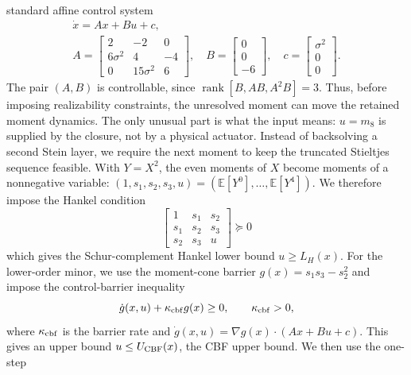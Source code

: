 \documentclass{article}
\theoremstyle{definition}
\begin{document}
standard affine control system
\begin{equation}\label{eq:dw-affine-control}
  \begin{gathered}
  \dot{x}=Ax+Bu+c,\\
  A=
  \begin{bmatrix}
    2 & -2 & 0\\
    6\sigma^2 & 4 & -4\\
    0 & 15\sigma^2 & 6
  \end{bmatrix},
  \quad
  B=
  \begin{bmatrix}
    0\\ 0\\ -6
  \end{bmatrix},
  \quad
  c=
  \begin{bmatrix}
    \sigma^2\\ 0\\ 0
  \end{bmatrix}.
  \end{gathered}
\end{equation}
The pair $(A,B)$ is controllable, since
$\operatorname{rank}[B,AB,A^2B]=3$. Thus, before imposing realizability
constraints, the unresolved moment can move the retained moment
dynamics. The only unusual part is what the input means: $u=m_8$ is
supplied by the closure, not by a physical actuator.
Instead of backsolving a second Stein layer, we require the next moment
to keep the truncated Stieltjes sequence feasible. With $Y=X^2$,
the even moments of $X$ become moments of a nonnegative variable:
$(1,s_1,s_2,s_3,u)=(\mathbb{E}[Y^0],\ldots,\mathbb{E}[Y^4])$.
We therefore impose the Hankel condition
\begin{equation}\label{eq:dw-hankel-condition}
  \begin{bmatrix}
    1 & s_1 & s_2\\
    s_1 & s_2 & s_3\\
    s_2 & s_3 & u
  \end{bmatrix}\succeq 0
\end{equation}
which gives the Schur-complement Hankel lower bound $u\ge L_H(x)$.
For the lower-order minor, we use the moment-cone barrier
$g(x)=s_1s_3-s_2^2$ and impose the control-barrier inequality
\begin{equation}\label{eq:dw-cbf-condition}
  \dot{g}(x,u)+\kappa_{\rm cbf} g(x)\ge 0,
  \qquad \kappa_{\rm cbf}>0,
\end{equation}
where $\kappa_{\rm cbf}$ is the barrier rate and
$\dot g(x,u)=\nabla g(x)\cdot(Ax+Bu+c)$. This gives an upper bound
$u\le U_{\rm CBF}(x)$, the CBF upper bound. We then use the one-step
\end{document}
